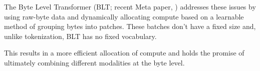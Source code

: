 The Byte Level Transformer (BLT; recent Meta paper, \cite{pagnoni2024bytelatenttransformerpatches}) addresses these issues by using raw-byte data and
dynamically allocating compute based on a learnable method of grouping bytes into patches.
These batches don't have a fixed size and, unlike tokenization, BLT has no fixed vocabulary.

This results in a more efficient allocation of compute and holds the promise of ultimately combining different modalities at the byte level.
